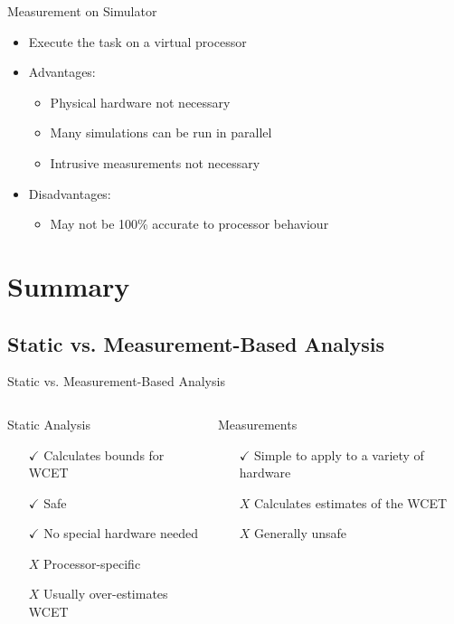 \documentclass{beamer}
\begin{document}
\begin{frame}{Measurement on Simulator}
  \begin{itemize}
    \item Execute the task on a virtual processor
    \item Advantages:
      \begin{itemize}
        \item Physical hardware not necessary
        \item Many simulations can be run in parallel
        \item Intrusive measurements not necessary
      \end{itemize}
    \item Disadvantages:
      \begin{itemize}
        \item May not be 100\% accurate to processor behaviour
      \end{itemize}
  \end{itemize}
\end{frame}

\section{Summary}
\subsection{Static vs. Measurement-Based Analysis}

\begin{frame}{Static vs. Measurement-Based Analysis}
  \begin{columns}
    \begin{column}{0.5\textwidth}
      Static Analysis
      \begin{itemize}
        \item[$\checkmark$] Calculates bounds for WCET
        \item[$\checkmark$] Safe
        \item[$\checkmark$] No special hardware needed
        \item[$X$] Processor-specific
        \item[$X$] Usually over-estimates WCET
      \end{itemize}
    \end{column}
    \begin{column}{0.5\textwidth}
      \pause
      Measurements
      \begin{itemize}
        \item[$\checkmark$] Simple to apply to a variety of hardware
        \item[$X$] Calculates estimates of the WCET
        \item[$X$] Generally unsafe
        \item[]
        \item[]
      \end{itemize}
    \end{column}
  \end{columns}
\end{frame}
\end{document}

